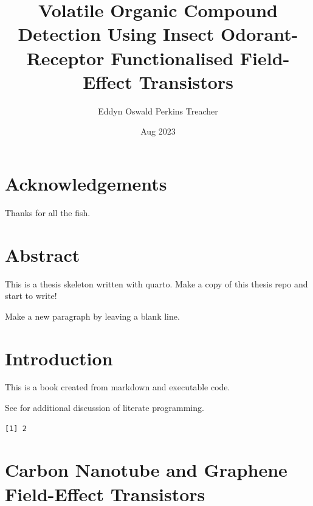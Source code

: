 \documentclass[
  a4paper,
]{scrbook}
\title{Volatile Organic Compound Detection Using Insect Odorant-Receptor
Functionalised Field-Effect Transistors}
\author{Eddyn Oswald Perkins Treacher}
\date{Aug 2023}
\begin{document}
\frontmatter
\maketitle
\ifdefined\Shaded\renewenvironment{Shaded}{\begin{tcolorbox}[enhanced, boxrule=0pt, borderline west={3pt}{0pt}{shadecolor}, breakable, sharp corners, frame hidden, interior hidden]}{\end{tcolorbox}}\fi

\mainmatter
{}

\hypertarget{acknowledgements}{%
\chapter*{Acknowledgements}\label{acknowledgements}}


Thanks for all the fish.


\hypertarget{abstract}{%
\chapter*{Abstract}\label{abstract}}


This is a thesis skeleton written with quarto. Make a copy of this
thesis repo and start to write!

Make a new paragraph by leaving a blank line.

\newpage
\tableofcontents


\hypertarget{introduction}{%
\chapter{Introduction}\label{introduction}}

This is a book created from markdown and executable code.

See for additional discussion of literate programming.

\begin{verbatim}
[1] 2
\end{verbatim}


\hypertarget{carbon-nanotube-and-graphene-field-effect-transistors}{%
\chapter{Carbon Nanotube and Graphene Field-Effect
Transistors}\label{carbon-nanotube-and-graphene-field-effect-transistors}}
\end{document}
